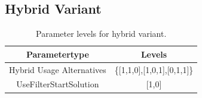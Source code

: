 \subsection{Hybrid Variant}
\label{subsec_parameterStuy_hybrid}

\begin{table}[ht]
    \centering
    \begin{tabular}{c c }
        \toprule
        Parametertype             & Levels                      \\
        \midrule
        Hybrid Usage Alternatives & \{[1,1,0],[1,0,1],[0,1,1]\} \\
        UseFilterStartSolution    & [1,0]                       \\
        \bottomrule
    \end{tabular}
    \caption{Parameter levels for hybrid variant.}
    \label{tab:parameters_hybrid}
\end{table}
